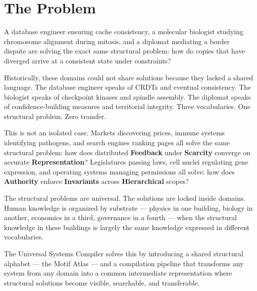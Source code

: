 \documentclass[11pt,a4paper]{article}
\newcommand{\motif}[1]{\textbf{\textcolor{atlasblue}{#1}}}
\begin{document}
\tableofcontents
\newpage

\section{The Problem}

A database engineer ensuring cache consistency, a molecular biologist studying chromosome alignment during mitosis, and a diplomat mediating a border dispute are solving the exact same structural problem: how do copies that have diverged arrive at a consistent state under constraints?

Historically, these domains could not share solutions because they lacked a shared language. The database engineer speaks of CRDTs and eventual consistency. The biologist speaks of checkpoint kinases and spindle assembly. The diplomat speaks of confidence-building measures and territorial integrity. Three vocabularies. One structural problem. Zero transfer.

This is not an isolated case. Markets discovering prices, immune systems identifying pathogens, and search engines ranking pages all solve the same structural problem: how does distributed \motif{Feedback} under \motif{Scarcity} converge on accurate \motif{Representation}? Legislatures passing laws, cell nuclei regulating gene expression, and operating systems managing permissions all solve: how does \motif{Authority} enforce \motif{Invariants} across \motif{Hierarchical} scopes?

The structural problems are universal. The solutions are locked inside domains. Human knowledge is organized by substrate --- physics in one building, biology in another, economics in a third, governance in a fourth --- when the structural knowledge in these buildings is largely the same knowledge expressed in different vocabularies.

The Universal Systems Compiler solves this by introducing a shared structural alphabet --- the Motif Atlas --- and a compilation pipeline that transforms any system from any domain into a common intermediate representation where structural solutions become visible, searchable, and transferable.
\end{document}
